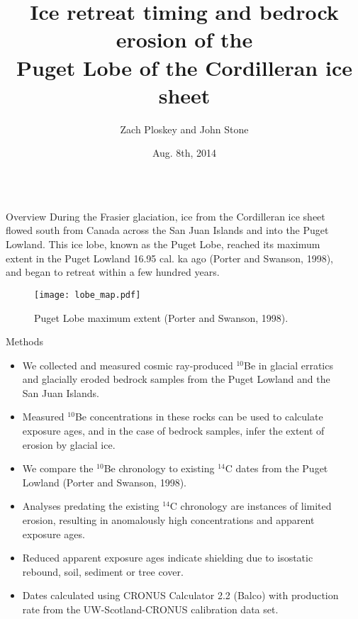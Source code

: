 \documentclass{beamer}
\title{Ice retreat timing and bedrock erosion of the\\Puget Lobe of the Cordilleran ice sheet}
\author{Zach Ploskey and John Stone}
\institute{Cosmogenic Nuclide Lab, Dept. of Earth and Space Sciences, University of Washington, Seattle}
\date{Aug. 8th, 2014}
\begin{document}
\begin{frame}{}\centering

\begin{columns}[T]

\begin{column}{0.32\columnwidth}

\begin{block}{Overview}	
During the Frasier glaciation, ice from the Cordilleran ice sheet flowed south from Canada across the San Juan Islands and into the Puget Lowland.
This ice lobe, known as the Puget Lobe, reached its maximum extent in the Puget Lowland 16.95 cal. ka ago  (Porter and Swanson, 1998), and began to retreat within a few hundred years.

\begin{figure}
\texttt{[image: lobe\_map.pdf]}
\caption*{Puget Lobe maximum extent (Porter and Swanson, 1998).}
\end{figure}

\end{block}

\begin{block}{Methods}
\begin{itemize}
\item We collected and measured cosmic ray-produced $^{10}$Be in glacial erratics and glacially eroded bedrock samples from the Puget Lowland and the San Juan Islands.
\item Measured $^{10}$Be concentrations in these rocks can be used to calculate exposure ages, and in the case of bedrock samples, infer the extent of erosion by glacial ice.
\item We compare the $^{10}$Be chronology to existing $^{14}$C dates from the Puget Lowland (Porter and Swanson, 1998).
\item Analyses predating the existing $^{14}$C chronology are instances of limited erosion, resulting in anomalously high concentrations and apparent exposure ages.
\item Reduced apparent exposure ages indicate shielding due to isostatic rebound, soil, sediment or tree cover.
\item Dates calculated using CRONUS Calculator 2.2 (Balco) with production rate from the UW-Scotland-CRONUS calibration data set.
\end{itemize}
\end{block}

\end{column}
	
\begin{column}{.32\columnwidth}


\end{column}
\end{columns}
\end{frame}
\end{document}
